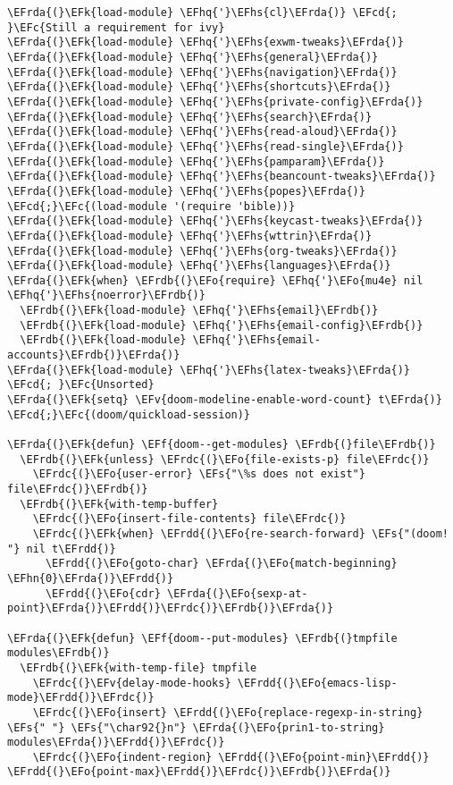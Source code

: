 \documentclass[a4wide,10pt]{article}
\newcommand{\EFc}[1]{\textcolor{EFc}{#1}} %
\newcommand{\EFcd}[1]{\textcolor{EFcd}{#1}} %
\newcommand{\EFs}[1]{\textcolor{EFs}{#1}} %
\newcommand{\EFk}[1]{\textcolor{EFk}{#1}} %
\newcommand{\EFf}[1]{\textcolor{EFf}{#1}} %
\newcommand{\EFv}[1]{\textcolor{EFv}{#1}} %
\newcommand{\EFo}[1]{\textcolor{EFo}{#1}} %
\newcommand{\EFhn}[1]{\textcolor{EFhn}{\textbf{#1}}} %
\newcommand{\EFhq}[1]{\textcolor{EFhq}{#1}} %
\newcommand{\EFhs}[1]{\textcolor{EFhs}{#1}} %
\newcommand{\EFrda}[1]{\textcolor{EFrda}{#1}} %
\newcommand{\EFrdb}[1]{\textcolor{EFrdb}{#1}} %
\newcommand{\EFrdc}[1]{\textcolor{EFrdc}{#1}} %
\newcommand{\EFrdd}[1]{\textcolor{EFrdd}{#1}} %
\begin{document}
\begin{Code}
\begin{Verbatim}
\EFrda{(}\EFk{load-module} \EFhq{'}\EFhs{cl}\EFrda{)} \EFcd{; }\EFc{Still a requirement for ivy}
\EFrda{(}\EFk{load-module} \EFhq{'}\EFhs{exwm-tweaks}\EFrda{)}
\EFrda{(}\EFk{load-module} \EFhq{'}\EFhs{general}\EFrda{)}
\EFrda{(}\EFk{load-module} \EFhq{'}\EFhs{navigation}\EFrda{)}
\EFrda{(}\EFk{load-module} \EFhq{'}\EFhs{shortcuts}\EFrda{)}
\EFrda{(}\EFk{load-module} \EFhq{'}\EFhs{private-config}\EFrda{)}
\EFrda{(}\EFk{load-module} \EFhq{'}\EFhs{search}\EFrda{)}
\EFrda{(}\EFk{load-module} \EFhq{'}\EFhs{read-aloud}\EFrda{)}
\EFrda{(}\EFk{load-module} \EFhq{'}\EFhs{read-single}\EFrda{)}
\EFrda{(}\EFk{load-module} \EFhq{'}\EFhs{pamparam}\EFrda{)}
\EFrda{(}\EFk{load-module} \EFhq{'}\EFhs{beancount-tweaks}\EFrda{)}
\EFrda{(}\EFk{load-module} \EFhq{'}\EFhs{popes}\EFrda{)}
\EFcd{;}\EFc{(load-module '(require 'bible))}
\EFrda{(}\EFk{load-module} \EFhq{'}\EFhs{keycast-tweaks}\EFrda{)}
\EFrda{(}\EFk{load-module} \EFhq{'}\EFhs{wttrin}\EFrda{)}
\EFrda{(}\EFk{load-module} \EFhq{'}\EFhs{org-tweaks}\EFrda{)}
\EFrda{(}\EFk{load-module} \EFhq{'}\EFhs{languages}\EFrda{)}
\EFrda{(}\EFk{when} \EFrdb{(}\EFo{require} \EFhq{'}\EFo{mu4e} nil \EFhq{'}\EFhs{noerror}\EFrdb{)}
  \EFrdb{(}\EFk{load-module} \EFhq{'}\EFhs{email}\EFrdb{)}
  \EFrdb{(}\EFk{load-module} \EFhq{'}\EFhs{email-config}\EFrdb{)}
  \EFrdb{(}\EFk{load-module} \EFhq{'}\EFhs{email-accounts}\EFrdb{)}\EFrda{)}
\EFrda{(}\EFk{load-module} \EFhq{'}\EFhs{latex-tweaks}\EFrda{)}
\EFcd{; }\EFc{Unsorted}
\EFrda{(}\EFk{setq} \EFv{doom-modeline-enable-word-count} t\EFrda{)}
\EFcd{;}\EFc{(doom/quickload-session)}

\EFrda{(}\EFk{defun} \EFf{doom--get-modules} \EFrdb{(}file\EFrdb{)}
  \EFrdb{(}\EFk{unless} \EFrdc{(}\EFo{file-exists-p} file\EFrdc{)}
    \EFrdc{(}\EFo{user-error} \EFs{"\%s does not exist"} file\EFrdc{)}\EFrdb{)}
  \EFrdb{(}\EFk{with-temp-buffer}
    \EFrdc{(}\EFo{insert-file-contents} file\EFrdc{)}
    \EFrdc{(}\EFk{when} \EFrdd{(}\EFo{re-search-forward} \EFs{"(doom! "} nil t\EFrdd{)}
      \EFrdd{(}\EFo{goto-char} \EFrda{(}\EFo{match-beginning} \EFhn{0}\EFrda{)}\EFrdd{)}
      \EFrdd{(}\EFo{cdr} \EFrda{(}\EFo{sexp-at-point}\EFrda{)}\EFrdd{)}\EFrdc{)}\EFrdb{)}\EFrda{)}

\EFrda{(}\EFk{defun} \EFf{doom--put-modules} \EFrdb{(}tmpfile modules\EFrdb{)}
  \EFrdb{(}\EFk{with-temp-file} tmpfile
    \EFrdc{(}\EFv{delay-mode-hooks} \EFrdd{(}\EFo{emacs-lisp-mode}\EFrdd{)}\EFrdc{)}
    \EFrdc{(}\EFo{insert} \EFrdd{(}\EFo{replace-regexp-in-string} \EFs{" "} \EFs{"\char92{}n"} \EFrda{(}\EFo{prin1-to-string} modules\EFrda{)}\EFrdd{)}\EFrdc{)}
    \EFrdc{(}\EFo{indent-region} \EFrdd{(}\EFo{point-min}\EFrdd{)} \EFrdd{(}\EFo{point-max}\EFrdd{)}\EFrdc{)}\EFrdb{)}\EFrda{)}


\end{Verbatim}
\end{Code}
\end{document}
